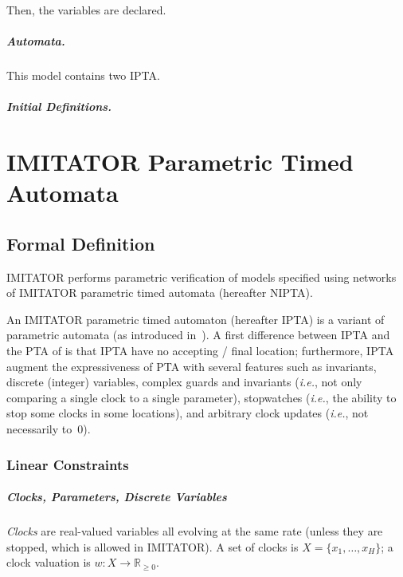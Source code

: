 \documentclass[a4paper,11pt]{report}
\newcommand{\Clock}{X} %
\newcommand{\ClockCard}{H} %
\newcommand{\clock}{x} %
\newcommand{\clockval}{w} %
\newcommand{\grandr}{{\mathbb R}}
\newcommand{\grandrplus}{\grandr_{\geq 0}}
\newcommand{\imitator}{\textsf{IMITATOR}}
\newcommand{\IPTA}{IPTA}
\newcommand{\NIPTA}{NIPTA}
\newcommand{\paragraphe}[1]{\paragraph{#1.}}
\newcommand{\ie}{\textcolor{colorok}{\textit{i.e.}, }}
\begin{document}
Then, the variables are declared.


\paragraphe{Automata}
This model contains two \IPTA{}.

\paragraphe{Initial Definitions}







\chapter{IMITATOR Parametric Timed Automata}\label{section:IPTA}

\section{Formal Definition}

\imitator{} performs parametric verification of models specified using networks of \imitator{} parametric timed automata (hereafter \NIPTA{}).

An \imitator{} parametric timed automaton (hereafter \IPTA{}) is a variant of parametric automata (as introduced in~\cite{AHV93}).
A first difference between \IPTA{} and the PTA of \cite{AHV93} is that \IPTA{} have no accepting / final location;
furthermore, \IPTA{} augment the expressiveness of PTA with several features such as invariants, discrete (integer) variables, complex guards and invariants (\ie{} not only comparing a single clock to a single parameter), stopwatches (\ie{} the ability to stop some clocks in some locations), and arbitrary clock updates (\ie{} not necessarily to~0).


\subsection{Linear Constraints}


\paragraph{Clocks, Parameters, Discrete Variables}
\emph{Clocks} are real-valued variables all evolving at the same rate (unless they are stopped, which is allowed in \imitator{}).
A set of clocks is $\Clock = \{ \clock_1, \dots, \clock_\ClockCard \}$;
a clock valuation is
$\clockval \colon \Clock \rightarrow \grandrplus$.
\end{document}
